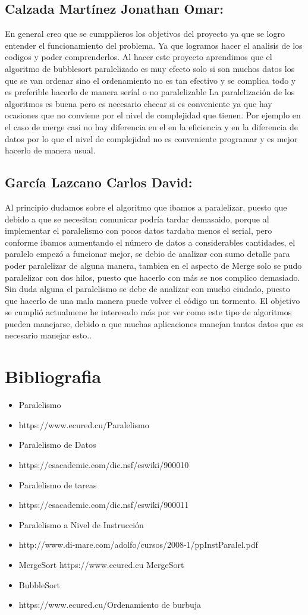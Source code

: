 \documentclass[11pt,letterpaper]{report}
\begin{document}
\subsection*{Calzada Martínez Jonathan Omar:}
En general creo que se cumpplieros los objetivos del proyecto ya que se logro entender el funcionamiento del problema. Ya que logramos hacer el analisis de los codigos y poder comprenderlos. Al hacer este proyecto aprendimos que el algoritmo de bubblesort paralelizado es  muy efecto solo si son muchos datos los que se van ordenar sino el ordenamiento no es tan efectivo y se complica todo y es preferible hacerlo de manera seríal o no paralelizable
La paralelizaci\' on de los algoritmos es buena pero es necesario checar si es conveniente ya que hay ocasiones que no conviene por el nivel de complejidad que tienen. Por ejemplo en el caso de merge casi no hay diferencia en el en la eficiencia y en la diferencia de datos por lo que el nivel de complejidad no es conveniente programar y es mejor hacerlo de manera usual.
\subsection*{García Lazcano Carlos David:}
Al principio dudamos sobre el algoritmo que ibamos a paralelizar, puesto que debido a que se necesitan comunicar podría tardar demasaido, porque al implementar el paralelismo con pocos datos tardaba menos el serial, pero conforme ibamos aumentando el número de datos a considerables cantidades,
el paralelo empez\' o a funcionar mejor, se debio de analizar con sumo detalle para poder paralelizar de alguna manera, tambien en el aspecto de Merge solo se pudo paralelizar con dos hilos, puesto que hacerlo con más se nos complico demasiado.
Sin duda alguna el paralelismo se debe de analizar con mucho ciudado, puesto que hacerlo de una mala manera puede volver el c\' odigo un tormento. El objetivo se cumpli\' o actualmene he interesado más por ver como este tipo de algoritmos pueden manejarse, debido a que muchas aplicaciones manejan tantos datos que es necesario manejar esto..
\newpage
\section*{Bibliografia}
\begin{itemize}
\item Paralelismo
\item https://www.ecured.cu/Paralelismo
\item Paralelismo de Datos
\item https://esacademic.com/dic.nsf/eswiki/900010
\item Paralelismo de tareas
\item https://esacademic.com/dic.nsf/eswiki/900011
\item Paralelismo a Nivel de Instrucci\'on
\item http://www.di-mare.com/adolfo/cursos/2008-1/ppInstParalel.pdf
\item MergeSort https://www.ecured.cu MergeSort
\item BubbleSort
\item https://www.ecured.cu/Ordenamiento de burbuja
\end{itemize} 
\end{document}
